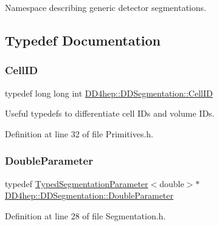 Namespace describing generic detector segmentations. 

\subsection{Typedef Documentation}
\hypertarget{namespace_d_d4hep_1_1_d_d_segmentation_ac7af071d85cb48820914434a07e21ba1}{}\label{namespace_d_d4hep_1_1_d_d_segmentation_ac7af071d85cb48820914434a07e21ba1} 
\subsubsection{\texorpdfstring{Cell\+ID}{CellID}}
{\footnotesize\ttfamily typedef long long int \hyperlink{namespace_d_d4hep_1_1_d_d_segmentation_ac7af071d85cb48820914434a07e21ba1}{D\+D4hep\+::\+D\+D\+Segmentation\+::\+Cell\+ID}}



Useful typedefs to differentiate cell I\+Ds and volume I\+Ds. 



Definition at line 32 of file Primitives.\+h.

\hypertarget{namespace_d_d4hep_1_1_d_d_segmentation_a58fbf7ecc413a4ffb59ab7b49d1af947}{}\label{namespace_d_d4hep_1_1_d_d_segmentation_a58fbf7ecc413a4ffb59ab7b49d1af947} 
\subsubsection{\texorpdfstring{Double\+Parameter}{DoubleParameter}}
{\footnotesize\ttfamily typedef \hyperlink{class_d_d4hep_1_1_d_d_segmentation_1_1_typed_segmentation_parameter}{Typed\+Segmentation\+Parameter}$<$double$>$$\ast$ \hyperlink{namespace_d_d4hep_1_1_d_d_segmentation_a58fbf7ecc413a4ffb59ab7b49d1af947}{D\+D4hep\+::\+D\+D\+Segmentation\+::\+Double\+Parameter}}



Definition at line 28 of file Segmentation.\+h.

\hypertarget{namespace_d_d4hep_1_1_d_d_segmentation_ae7964d33264473a9df6cfb5194cfb740}{}\label{namespace_d_d4hep_1_1_d_d_segmentation_ae7964d33264473a9df6cfb5194cfb740} 
